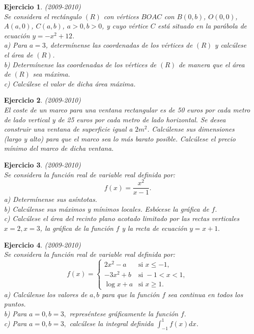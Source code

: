 \documentclass[12pt, a4paper]{amsart}
\newtheorem{ejer}{Ejercicio}
\begin{document}
\begin{ejer}\em (2009-2010)\\
Se considera el rectángulo $(R)$ con vértices $BOAC$ con $B(0,b)$, $O(0,0)$, $A(a,0)$, $C(a,b)$, $a>0,b>0$, y cuyo vértice $C$ está situado en la parábola de ecuación $y=-x^2+12$.\\
a) Para $a=3$, determínense las coordenadas de los vértices de $(R)$ y calcúlese el área de $(R)$.\\
b) Determínense las coordenadas de los vértices de $(R)$ de manera que el área de $(R)$ sea máxima.\\
c) Calcúlese el valor de dicha área máxima.
\end{ejer}

\begin{ejer}\em (2009-2010)\\
El coste de un marco para una ventana rectangular es de 50 euros por cada metro de lado vertical y de 25 euros por cada metro de lado horizontal. Se desea construir una ventana de superficie igual a $2m^2$. Calcúlense sus dimensiones (largo y alto) para que el marco sea lo más barato posible. Calcúlese el precio mínimo del marco de dicha ventana.
\end{ejer}

\begin{ejer}\em (2009-2010)\\
Se considera la función real de variable real definida por: 
$$
f(x)=\frac{x^2}{x-1}.
$$
a) Determínense sus asíntotas.\\
b) Calcúlense sus máximos y mínimos locales. Esbócese la gráfica de $f$.\\
c) Calcúlese el área del recinto plano acotado limitado por las rectas verticales $x=2,x=3$, la gráfica de la función $f$ y la recta de ecuación $y=x+1.$
\end{ejer}

\begin{ejer}\em (2009-2010)\\
Se considera la función real de variable real definida por:
\begin{equation*}
f(x)=\left \{ \begin{matrix} 2x^2-a & \mbox{si } x\leq -1,
\\ -3x^2+b & \mbox{si } -1<x<1,
\\ \log x+a & \mbox{si } x\geq 1. \end{matrix}\right. 
\end{equation*}
a) Calcúlense los valores de $a,b$ para que la función $f$ sea continua en todos los puntos.\\
b) Para $a=0,b=3,$ represéntese gráficamente la función $f$.\\
c) Para $a=0,b=3,$ calcúlese la integral definida $\int_{-1}^1f(x)dx$.
\end{ejer}
\end{document}
